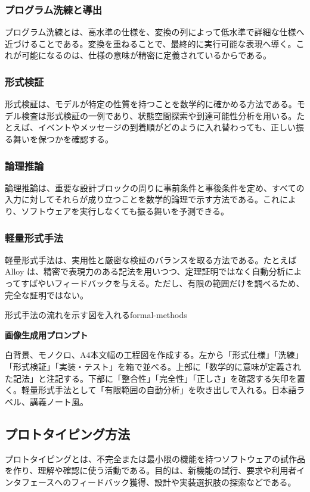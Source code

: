 \documentclass[a4paper,11pt]{ltjsarticle}
\newcommand{\prompt}[1]{\par\noindent\textbf{画像生成用プロンプト}\par\small #1\normalsize}
\begin{document}
\subsubsection{プログラム洗練と導出}
プログラム洗練とは、高水準の仕様を、変換の列によって低水準で詳細な仕様へ近づけることである。変換を重ねることで、最終的に実行可能な表現へ導く。これが可能になるのは、仕様の意味が精密に定義されているからである。

\subsubsection{形式検証}
形式検証は、モデルが特定の性質を持つことを数学的に確かめる方法である。モデル検査は形式検証の一例であり、状態空間探索や到達可能性分析を用いる。たとえば、イベントやメッセージの到着順がどのように入れ替わっても、正しい振る舞いを保つかを確認する。

\subsubsection{論理推論}
論理推論は、重要な設計ブロックの周りに事前条件と事後条件を定め、すべての入力に対してそれらが成り立つことを数学的論理で示す方法である。これにより、ソフトウェアを実行しなくても振る舞いを予測できる。

\subsubsection{軽量形式手法}
軽量形式手法は、実用性と厳密な検証のバランスを取る方法である。たとえば Alloy は、精密で表現力のある記法を用いつつ、定理証明ではなく自動分析によってすばやいフィードバックを与える。ただし、有限の範囲だけを調べるため、完全な証明ではない。

\begin{todobox}{形式手法の流れを示す図を入れる}{formal-methods}
\prompt{白背景、モノクロ、A4本文幅の工程図を作成する。左から「形式仕様」「洗練」「形式検証」「実装・テスト」を箱で並べる。上部に「数学的に意味が定義された記法」と注記する。下部に「整合性」「完全性」「正しさ」を確認する矢印を置く。軽量形式手法として「有限範囲の自動分析」を吹き出しで入れる。日本語ラベル、講義ノート風。}
\end{todobox}

\subsection{プロトタイピング方法}
プロトタイピングとは、不完全または最小限の機能を持つソフトウェアの試作品を作り、理解や確認に使う活動である。目的は、新機能の試行、要求や利用者インタフェースへのフィードバック獲得、設計や実装選択肢の探索などである。
\end{document}
